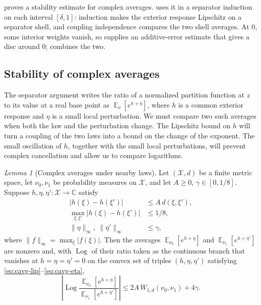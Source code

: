 \documentclass[11pt,reqno]{article}
\theoremstyle{plain}
\newtheorem{lemma}[theorem]{Lemma}
\theoremstyle{definition}
\theoremstyle{remark}
\newtheorem{lemma}[lemma]{Lemma}
\theoremstyle{definition}
\theoremstyle{remark}
\newcommand{\C}{\mathbb{C}}
\newcommand{\Log}{\operatorname{Log}}          %
\DeclareMathOperator{\E}{\mathbb{E}}
\newcommand{\Wd}{W_{1,d}}                        %
\begin{document}
 proves a stability estimate for complex
averages.   uses it in a separator induction
on each interval \([\delta,1]\): induction makes the exterior response
Lipschitz on a separator shell, and coupling independence compares the
two shell averages.  At \(0\), some interior weights vanish, so
 supplies an additive-error estimate that gives a
disc around \(0\);  combines the two.

\subsection{Stability of complex averages}\label{sec:complex-average}

The separator argument writes the ratio of a normalized partition
function at \(z\) to its value at a real base point as
\(\E_\nu[e^{h+\eta}]\), where \(h\) is a common exterior response and
\(\eta\) is a small local perturbation.  We must compare two such averages
when both the law and the perturbation change.  The Lipschitz bound on
\(h\) will turn a coupling of the two laws into a bound on the change
of the exponent.  The small oscillation of \(h\), together with the
small local perturbations, will prevent complex cancellation and allow
us to compare logarithms.

\begin{lemma}[Complex averages under nearby laws]\label{lem:cavg}
Let \((\mathcal X,d)\) be a finite metric space, let \(\nu_0,\nu_1\) be
probability measures on \(\mathcal X\), and let \(A\ge0\),
\(\gamma\in[0,1/8]\).
Suppose \(h,\eta,\eta'\colon\mathcal X\to\C\) satisfy
\begin{align}
  |h(\xi)-h(\xi')|&\le A\,d(\xi,\xi'),\label{eq:cavg-lip}\\
  \max_{\xi,\xi'}|h(\xi)-h(\xi')|&\le1/8,\label{eq:cavg-range}\\
  \|\eta\|_\infty,\ \|\eta'\|_\infty&\le\gamma,\label{eq:cavg-eta}
\end{align}
where \(\|f\|_\infty=\max_\xi|f(\xi)|\).  Then the averages \(\E_{\nu_0}[e^{h+\eta}]\) and
\(\E_{\nu_1}[e^{h+\eta'}]\) are nonzero
and, with \(\Log\) of their ratio taken as the continuous branch that
vanishes at \(h=\eta=\eta'=0\) on the convex set of triples
\((h,\eta,\eta')\) satisfying
\eqref{eq:cavg-lip}--\eqref{eq:cavg-eta},
\begin{equation}\label{eq:cavg}
  \left|\Log\frac{\E_{\nu_0}[e^{h+\eta}]}{\E_{\nu_1}[e^{h+\eta'}]}\right|
  \le2A\,\Wd(\nu_0,\nu_1)+4\gamma.
\end{equation}
\end{lemma}
\end{document}
